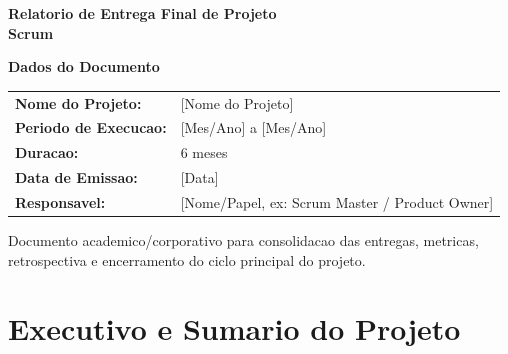 \documentclass[12pt,a4paper]{article}
\newcommand{\placeholder}[1]{\textcolor{MediumGray}{[#1]}}
\begin{document}
\begin{titlepage}
  \thispagestyle{empty}

  \vspace*{1.2cm}
  {\color{white}\Huge\bfseries Relatorio de Entrega Final de Projeto}\\[0.35cm]
  {\color{white}\LARGE\bfseries Scrum}\\[1.6cm]

  \begin{tcolorbox}[
    colback=white,
    colframe=PrimaryBlue,
    width=\textwidth,
    boxrule=0.8pt,
    arc=3mm
  ]
    \Large\textbf{Dados do Documento}\\[0.4cm]
    \begin{tabularx}{\textwidth}{@{}L{5cm}Y@{}}
      \textbf{Nome do Projeto:} & \placeholder{Nome do Projeto} \\
      \textbf{Periodo de Execucao:} & \placeholder{Mes/Ano} a \placeholder{Mes/Ano} \\
      \textbf{Duracao:} & 6 meses \\
      \textbf{Data de Emissao:} & \placeholder{Data} \\
      \textbf{Responsavel:} & \placeholder{Nome/Papel, ex: Scrum Master / Product Owner} \\
    \end{tabularx}
  \end{tcolorbox}

  \vfill
  \begin{flushright}
    \textcolor{MediumGray}{Documento academico/corporativo para consolidacao das entregas, metricas, retrospectiva e encerramento do ciclo principal do projeto.}
  \end{flushright}
\end{titlepage}

\tableofcontents
\newpage

\section{Executivo e Sumario do Projeto}
\end{document}
